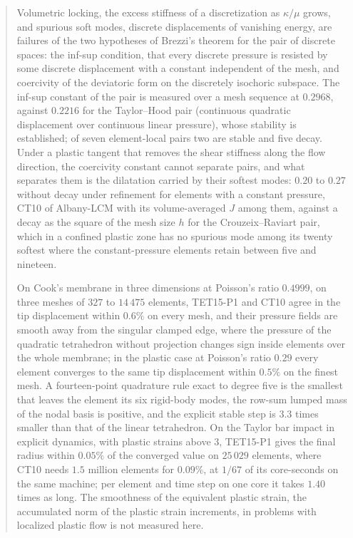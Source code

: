 \documentclass{article}
\theoremstyle{definition}
\theoremstyle{plain}
\begin{document}
\begin{abstract}
Volumetric locking, the excess stiffness of a
discretization as $\kappa/\mu$ grows, and spurious soft modes, discrete
displacements of vanishing energy, are failures of the two hypotheses of
Brezzi's theorem for the pair of discrete spaces: the inf-sup condition,
that every discrete pressure is resisted by some discrete displacement with
a constant independent of the mesh, and coercivity of the deviatoric form on
the discretely isochoric subspace. The inf-sup constant of the pair is
measured over a mesh sequence at $0.2968$, against $0.2216$ for the
Taylor--Hood pair (continuous quadratic displacement over continuous linear
pressure), whose stability is established; of seven element-local pairs two
are stable and five decay. Under a plastic tangent that removes the shear
stiffness along the flow direction, the coercivity constant cannot separate
pairs, and what separates them is the dilatation carried by their softest
modes: $0.20$ to $0.27$ without decay under refinement for elements with a
constant pressure, CT10 of Albany-LCM \cite{Foulk.etal:2021} with its
volume-averaged $J$ among them, against a decay as the square of the mesh
size $h$ for the Crouzeix--Raviart pair, which in a confined plastic zone has
no spurious mode among its twenty softest where the constant-pressure
elements retain between five and nineteen.

On Cook's membrane in three
dimensions at Poisson's ratio $0.4999$, on three meshes of $327$ to $14\,475$
elements, TET15-P1 and CT10 agree in the tip displacement within $0.6\%$ on every mesh, and
their pressure fields are smooth away from the singular clamped edge, where
the pressure of the quadratic tetrahedron without projection changes sign
inside elements over the whole membrane; in the plastic case at Poisson's
ratio $0.29$ every element converges to the same tip displacement within
$0.5\%$ on the finest mesh. A fourteen-point quadrature rule exact to degree
five is the smallest that leaves the element its six rigid-body modes, the
row-sum lumped mass of the nodal basis is positive, and the explicit stable
step is $3.3$ times smaller than that of the linear tetrahedron. On the
Taylor bar impact in explicit dynamics, with plastic strains above $3$,
TET15-P1 gives the final radius within $0.05\%$ of the converged value on
$25\,029$ elements, where CT10 needs $1.5$ million
elements for $0.09\%$, at $1/67$ of its core-seconds on the same machine;
per element and time step on one core it takes $1.40$ times as long. The
smoothness of the equivalent plastic strain, the accumulated norm of the
plastic strain increments, in problems with localized plastic flow is not
measured here.
\end{abstract}
\end{document}
